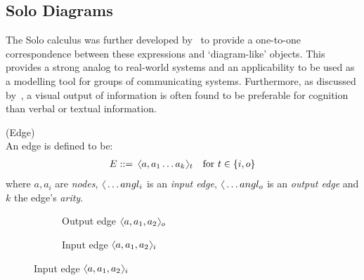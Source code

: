 \subsection{Solo Diagrams}
    The Solo calculus was further developed by~\cite{solo-diagrams} to provide a one-to-one correspondence between these  expressions and `diagram-like' objects.
    This provides a strong analog to real-world systems and an applicability to be used as a modelling tool for groups of communicating systems.
    Furthermore, as discussed by~\cite{learning-styles}, a visual output of information is often found to be preferable for cognition than verbal or textual information.


    \begin{definition}{(Edge)\\}
        An edge is defined to be:
        \begin{align}
            E \defeq \, \langl a, a_1 \ldots a_k\rangl_t \quad \text{for } t \in \{ i, o \}
        \end{align}
        where $a, a_i$ are \textit{nodes}, $\langl\ldots
angl_i$ is an \textit{input edge}, $\langl\ldots
angl_o$ is an \textit{output edge} and $k$ the edge's \textit{arity}.
    \end{definition}

    \begin{figure}[H]
        \centering
        \begin{subfigure}{0.4\linewidth}
            \centering
            \caption*{Output edge $\langl a, a_1, a_2\rangl_o$}
        \end{subfigure}
        \begin{subfigure}{0.4\linewidth}
            \centering
            \caption*{Input edge $\langl a, a_1, a_2\rangl_i$}
        \end{subfigure}
    \end{figure}

